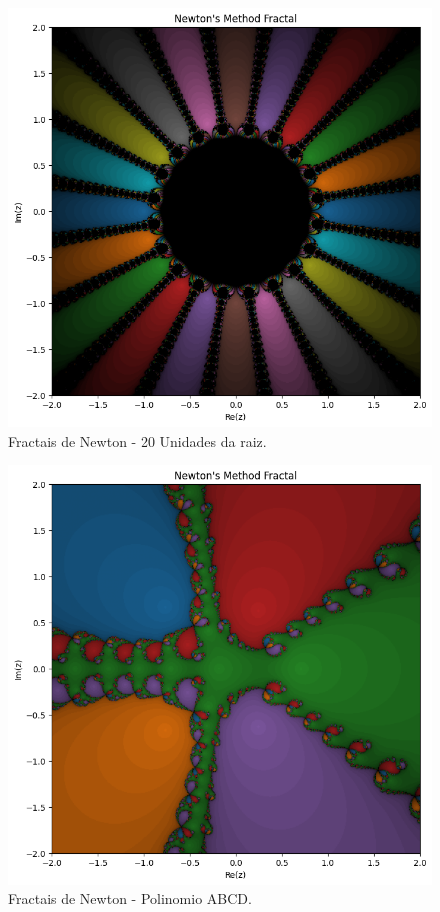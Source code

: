 \begin{figure}[H]
    \centering
    \includegraphics[width=1\textwidth]{Imagens/nr2d_fractals/unit_roots/unitroot20.png}
    \caption{Fractais de Newton - 20 Unidades da raiz.}
    \label{fig:fractaisnr_unitroots20}
\end{figure}

\begin{figure}[H]
    \centering
    \includegraphics[width=1\textwidth]{Imagens/nr2d_fractals/polinomials/nrfractal_polinomio.png}
    \caption{Fractais de Newton - Polinomio ABCD.}
    \label{fig:fractaisnr_polinomials1}
\end{figure}

